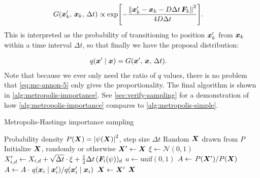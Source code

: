 \documentclass[Thesis.tex]{subfiles}
\begin{document}
\begin{align}
  \label{eq:mc-annon-5}
  G\qty(\bm{x}_k', \,\bm{x}_k,\,\Delta t) &\propto \exp[-\frac{\norm{\bm{x}_k' - \bm{x}_k - D\Delta t\,\bm{F}_k}^2}{4D\Delta t}].
\end{align}
This is interpreted as the probability of transitioning to position $\bm{x}_k'$
from $\bm{x}_k$ within a time interval $\Delta t$, so that finally we have the
proposal distribution:

\begin{align}
  q\qty(\bm{x}'\;\middle|\;\bm{x}) &=G\qty(\bm{x}', \,\bm{x},\,\Delta t).
\end{align}
Note that because we ever only need the ratio of $q$ values, there is no problem
that \cref{eq:mc-annon-5} only gives the proportionality. The final algorithm is
shown in \cref{alg:metropolis-importance}.
See \cref{sec:verify-sampling} for a demonstration of how
\cref{alg:metropolis-importance} compares to \cref{alg:metropolis-simple}.

\begin{algorithm}[h]
    \caption{Metropolis-Hastings importance sampling}
    \label{alg:metropolis-importance}
    \begin{algorithmic}[1]
        \Require Probability density $P(\bm{X}) = \abs{\psi(\bm{X})}^2$, step size $\Delta t$
        \Ensure Random $\bm{X}$ drawn from $P$
        \State Initialize $\bm{X}$, randomly or otherwise
        \Repeat
            \State $\bm{X}'\gets \bm{X}$
              \State $\xi\gets \mathcal{N}(0, 1)$
              \State $X_{i,d}'\gets X_{i,d} + \sqrt{\Delta t} \cdot \xi +
              \frac{1}{2}\Delta t\,(\bm{F}_i(\psi))_d$
            \EndFor
            \State $u\gets\text{unif}(0, 1)$
            \State $A\gets \flatfrac{P\qty(\vX')}{P\qty(\vX)}$
            \State $A\gets A\cdot \flatfrac{q\qty(\vx_i\;\middle|\;\vx_i')}{q\qty(\vx_i'\;\middle|\;\vx_i)}$
              \State $\bm{X} \gets \bm{X}'$
            \EndIf
            \State \Yield $\bm{X}$
          \EndFor
    \end{algorithmic}
\end{algorithm}
\end{document}

